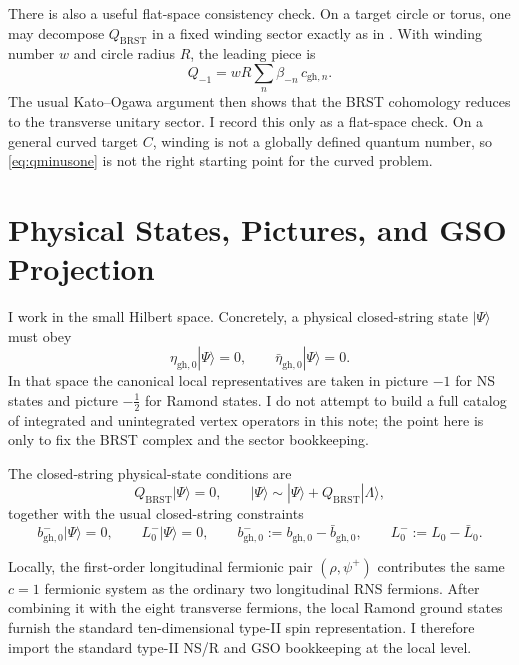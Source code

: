 \documentclass[11pt]{article}
\newcommand{\gh}{\mathrm{gh}}
\begin{document}
There is also a useful flat-space consistency check. On a target circle or torus, one may decompose $Q_{\mathrm{BRST}}$ in a fixed winding sector exactly as in \cite{gomis2000nonrelativisticclosedstringtheory}. With winding number $w$ and circle radius $R$, the leading piece is
\begin{equation}\label{eq:qminusone}
Q_{-1}=wR\sum_{n}\beta_{-n}\,c_{\gh,n}.
\end{equation}
The usual Kato--Ogawa argument then shows that the BRST cohomology reduces to the transverse unitary sector. I record this only as a flat-space check. On a general curved target $C$, winding is not a globally defined quantum number, so \eqref{eq:qminusone} is not the right starting point for the curved problem.

\section{Physical States, Pictures, and GSO Projection}
I work in the small Hilbert space. Concretely, a physical closed-string state $|\Psi\rangle$ must obey
\begin{equation}\label{eq:small-hilbert}
\eta_{\gh,0}|\Psi\rangle=0,
\qquad
\bar\eta_{\gh,0}|\Psi\rangle=0.
\end{equation}
In that space the canonical local representatives are taken in picture $-1$ for NS states and picture $-\tfrac12$ for Ramond states. I do not attempt to build a full catalog of integrated and unintegrated vertex operators in this note; the point here is only to fix the BRST complex and the sector bookkeeping.

The closed-string physical-state conditions are
\begin{equation}\label{eq:physical-state-conditions}
Q_{\mathrm{BRST}}|\Psi\rangle=0,
\qquad
|\Psi\rangle \sim |\Psi\rangle + Q_{\mathrm{BRST}}|\Lambda\rangle,
\end{equation}
together with the usual closed-string constraints
\begin{equation}\label{eq:level-matching-conditions}
b_{\gh,0}^-|\Psi\rangle=0,
\qquad
L_0^-|\Psi\rangle=0,
\qquad
b_{\gh,0}^-:=b_{\gh,0}-\bar b_{\gh,0},
\qquad
L_0^-:=L_0-\bar L_0.
\end{equation}

Locally, the first-order longitudinal fermionic pair $(\rho,\psi^+)$ contributes the same $c=1$ fermionic system as the ordinary two longitudinal RNS fermions. After combining it with the eight transverse fermions, the local Ramond ground states furnish the standard ten-dimensional type-II spin representation. I therefore import the standard type-II NS/R and GSO bookkeeping at the local level.
\end{document}
